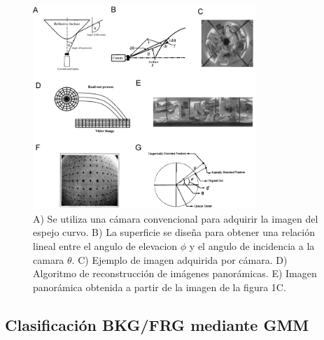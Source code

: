 \documentclass[12pt,a4paper]{article}
\begin{document}
\begin{figure}[!h]
  \centering
  \includegraphics[width=0.75\textwidth]{vca.png}
  \caption{A) Se utiliza una cámara convencional para adquirir la imagen del espejo curvo. B) La superficie se diseña para obtener una relación lineal entre el angulo de elevacion $\phi$  y el angulo de incidencia a la camara $\theta$. C) Ejemplo de imagen adquirida por cámara. D) Algoritmo de reconstrucción de imágenes panorámicas. E) Imagen panorámica obtenida a partir de la imagen de la figura 1C.}
  \label{fig:vca}
\end{figure}


\subsection{Clasificación BKG/FRG mediante GMM}
\end{document}
